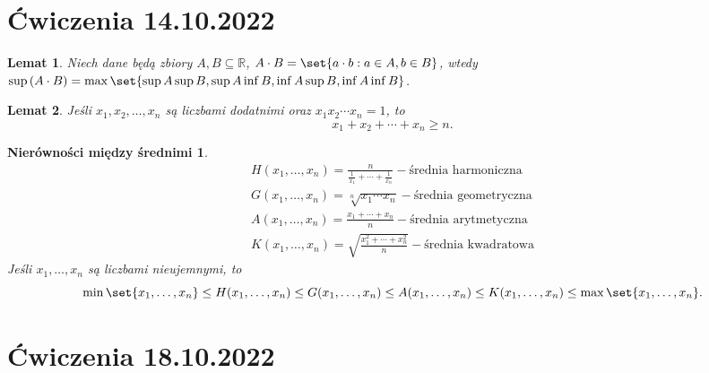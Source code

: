 \documentclass{article}
\newcommand{\R}{\mathbb{R}}
\DeclarePairedDelimiter\set\{\}
\newtheorem*{sred}{Nierówności między średnimi}
\newtheorem{lemma}{Lemat}
\begin{document}
                                            \section{Ćwiczenia 14.10.2022}

\begin{lemma} %
    Niech dane będą zbiory $A, B\subseteq\R$, $A\cdot B=\set{a\cdot b:a\in A,b\in B}$,
    wtedy $\sup{(A\cdot B)}=\max{\set{\sup{A}\sup{B},\sup{A}\inf{B},\inf{A}\sup{B},
    \inf{A}\inf{B}}}$.
\end{lemma}

\begin{lemma} %
    Jeśli $x_1,x_2,\ldots,x_n$ są liczbami dodatnimi oraz $x_1x_2\cdots x_n=1$, to
    \begin{equation*}
        x_1+x_2+\cdots+x_n\ge n.
    \end{equation*}
\end{lemma}

\begin{sred} %
    \begin{align*}
        H(x_1,\ldots,x_n)=\frac{n}{\frac{1}{x_1}+\cdots+\frac{1}{x_n}} - \text{średnia harmoniczna}\\
        G(x_1,\ldots,x_n)=\sqrt[n]{x_1\cdots x_n} - \text{średnia geometryczna}\\
        A(x_1,\ldots,x_n)=\frac{x_1+\cdots+x_n}{n} - \text{średnia arytmetyczna}\\
        K(x_1,\ldots,x_n)=\sqrt{\frac{x_1^2+\cdots+x_n^2}{n}} - \text{średnia kwadratowa}
    \end{align*}
    Jeśli $x_1,\ldots,x_n$ są liczbami nieujemnymi, to 
    \begin{equation*}
        \min{\set{x_1,\ldots,x_n}}\le H(x_1,\ldots,x_n)\le G(x_1,\ldots,x_n)\le
        A(x_1,\ldots,x_n)\le K(x_1,\ldots,x_n)\le \max{\set{x_1,\ldots,x_n}}.
    \end{equation*}
\end{sred}

                                            \section{Ćwiczenia 18.10.2022}
\end{document}
